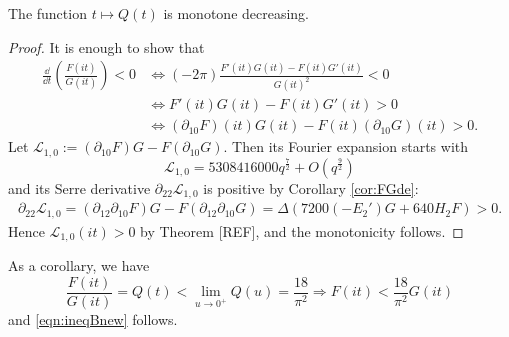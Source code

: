 \begin{proposition}\label{prop:Qdec}
The function $t \mapsto Q(t)$ is monotone decreasing.
\end{proposition}

\begin{proof}
It is enough to show that
\begin{align}
    \frac{\dd}{\dd t} \left(\frac{F(it)}{G(it)}\right) < 0 &\Leftrightarrow (- 2\pi) \frac{F'(it)G(it) - F(it) G'(it)}{G(it)^{2}} < 0 \\
    &\Leftrightarrow F'(it) G(it) - F(it) G'(it) > 0 \\
    &\Leftrightarrow (\partial_{10}F)(it) G(it) - F(it) (\partial_{10}G)(it) > 0.
\end{align}
Let $\mathcal{L}_{1, 0} := (\partial_{10}F) G - F (\partial_{10} G)$.
Then its Fourier expansion starts with
\[
    \mathcal{L}_{1, 0} = 5308416000 q^{\frac{7}{2}} + O(q^{\frac{9}{2}})
\]
and its Serre derivative $\partial_{22} \mathcal{L}_{1, 0}$ is positive by Corollary \ref{cor:FGde}:
\begin{align}
    \partial_{22} \mathcal{L}_{1, 0} = (\partial_{12} \partial_{10} F) G - F (\partial_{12}\partial_{10} G)
    = \Delta (7200 (-E_{2}') G + 640 H_2 F) > 0.
\end{align}
Hence $\mathcal{L}_{1, 0}(it) > 0$ by Theorem [REF], and the monotonicity follows.
\end{proof}


As a corollary, we have
\begin{equation}
  \frac{F(it)}{G(it)} = Q(t) < \lim_{u \to 0^+} Q(u) = \frac{18}{\pi^2} \Rightarrow F(it) < \frac{18}{\pi^2} G(it)
\end{equation}
and \eqref{eqn:ineqBnew} follows.


